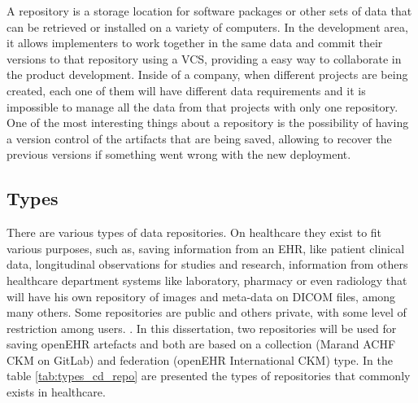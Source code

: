 \documentclass[mim_thesis.tex]{subfiles}
\begin{document}
A repository is a storage location for software packages or other sets of data that can be retrieved or installed on a variety of computers. In the development area, it allows implementers to work together in the same data and commit their versions to that repository using a \ac{VCS}, providing a easy way to collaborate in the product development. Inside of a company, when different projects are being created, each one of them will have different data requirements and it is impossible to manage all the data from that projects with only one repository. One of the most interesting things about a repository is the possibility of having a version control of the artifacts that are being saved, allowing to recover the previous versions if something went wrong with the new deployment.

\subsection{Types}

There are various types of data repositories. On healthcare they exist to fit various purposes, such as, saving information from an EHR, like patient clinical data, longitudinal observations for studies and research, information from others healthcare department systems like laboratory, pharmacy or even radiology that will have his own repository of images and meta-data on DICOM files, among many others. Some repositories are public and others private, with some level of restriction among users. \citep{wade2014traits}. In this dissertation, two repositories will be used for saving openEHR artefacts and both are based on a collection (Marand ACHF CKM on GitLab) and federation (openEHR International CKM) type. In the table \ref{tab:types_cd_repo} are presented the types of repositories that commonly exists in healthcare.
\end{document}
